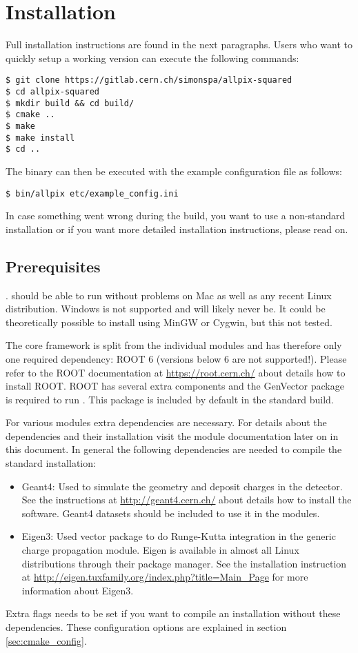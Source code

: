 \section{Installation}
\label{sec:installation}
Full installation instructions are found in the next paragraphs. Users who want to quickly setup a working version can execute the following commands:
\begin{verbatim}
$ git clone https://gitlab.cern.ch/simonspa/allpix-squared
$ cd allpix-squared
$ mkdir build && cd build/
$ cmake ..
$ make
$ make install
$ cd ..
\end{verbatim}
The binary can then be executed with the example configuration file as follows:
\begin{verbatim}
$ bin/allpix etc/example_config.ini
\end{verbatim}

In case something went wrong during the build, you want to use a non-standard installation or if you want more detailed installation instructions, please read on.
\subsection{Prerequisites}
\label{sec:prerequisites}.
\apsq should be able to run without problems on Mac as well as any recent Linux distribution. Windows is not supported and will likely never be. It could be theoretically possible to install \apsq using MinGW or Cygwin, but this not tested.

The core framework is split from the individual modules and \apsq has therefore only one required dependency: ROOT 6 (versions below 6 are not supported!). Please refer to the ROOT documentation at \url{https://root.cern.ch/} about details how to install ROOT. ROOT has several extra components and the GenVector package is required to run \apsq. This package is included by default in the standard build.

For various modules extra dependencies are necessary. For details about the dependencies and their installation visit the module documentation later on in this document. In general the following dependencies are needed to compile the standard installation:
\begin{itemize}
\item Geant4: Used to simulate the geometry and deposit charges in the detector. See the instructions at \url{http://geant4.cern.ch/} about details how to install the software. Geant4 datasets should be included to use it in the modules.
\item Eigen3: Used vector package to do Runge-Kutta integration in the generic charge propagation module. Eigen is available in almost all Linux distributions through their package manager. See the installation instruction at \url{http://eigen.tuxfamily.org/index.php?title=Main_Page} for more information about Eigen3.
\end{itemize}
Extra flags needs to be set if you want to compile an \apsq installation without these dependencies. These configuration options are explained in section \ref{sec:cmake_config}.

